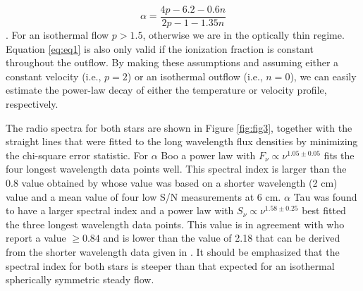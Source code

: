 \documentclass[iop]{emulateapj}
\begin{document}
\begin{equation}
\alpha = \frac{4p -6.2 -0.6n}{2p-1-1.35n}
\label{eq:eq1}
\end{equation}
\citep[e.g.,][]{1987ApJ...312..813S}. For an isothermal flow $p > 1.5$, otherwise we are in the optically thin regime. Equation \ref{eq:eq1} is also only valid if the ionization fraction is constant throughout the outflow. By making these assumptions and assuming either a constant velocity (i.e., $p=2$) or an isothermal outflow (i.e., $n=0$), we can easily estimate the power-law decay of either the temperature or velocity profile, respectively. 

The radio spectra for both stars are shown in Figure \ref{fig:fig3}, together with the straight lines that were fitted to the long wavelength flux densities by minimizing the chi-square error statistic. For $\alpha$ Boo a power law with $F_{\nu} \propto \nu ^{1.05 \pm 0.05}$ fits the four longest wavelength data points well. This spectral index is larger than the 0.8 value obtained by \cite{1986AJ.....91..602D} whose value was based on a shorter wavelength (2 cm) value and a mean value of four low S/N measurements at 6 cm. $\alpha$ Tau was found to have a larger spectral index and a power law with $S_{\nu} \propto \nu ^{1.58 \pm 0.25}$ best fitted the three longest wavelength data points. This value is in agreement with \cite{1986AJ.....91..602D} who report a value $\ge 0.84$ and is lower than the value of 2.18 that can be derived from the shorter wavelength data given in \cite{2007ApJ...655..946W}. It should be emphasized that the spectral index for both stars is steeper than that expected for an isothermal spherically symmetric steady flow. 
\end{document}
